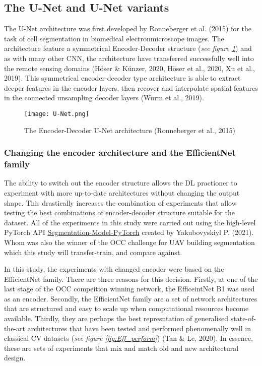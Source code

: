 \documentclass[11pt, a4paper, twoside]{report}
\begin{document}
\subsection{The U-Net and U-Net variants}\label{Unet}

The U-Net architecture was first developed by Ronneberger et al. (2015) for the task of cell segmentation in biomedical electronmicroscope images. The architecture feature a symmetrical Encoder-Decoder structure (\textit{see figure \ref{fig:U-Net}}) and as with many other CNN, the architecture have transferred successfully well into the remote sensing domains (Höser \& Künzer, 2020, Höser et al., 2020, Xu et al., 2019). This symmetrical encoder-decoder type architecture is able to extract deeper features in the encoder layers, then recover and interpolate spatial features in the connected unsampling decoder layers (Wurm et al., 2019).\\\par

\begin{figure}[H]
  \centering
  \texttt{[image: U-Net.png]}
  \caption{The Encoder-Decoder U-Net architecture (Ronneberger et al., 2015)}
  \label{fig:U-Net}
\end{figure}

\subsubsection{Changing the encoder architecture and the EfficientNet family}\label{EffNet}

The ability to switch out the encoder structure allows the DL practioner to experiment with more up-to-date architectures without changing the output shape. This drastically increases the combination of experiments that allow testing the best combinations of encoder-decoder structure suitable for the dataset. All of the experiments in this study were carried out using the high-level PyTorch API \href{https://segmentation-models-pytorch.readthedocs.io/en/latest/quickstart.html}{Segmentation-Model-PyTorch} created by Yakubovyskiyl P. (2021). Whom was also the winner of the OCC challenge for UAV building segmentation which this study will transfer-train, and compare against.\\\par

In this study, the experiments with changed encoder were based on the EfficientNet family. There are three reasons for this decision. Firstly, at one of the last stage of the OCC compeition winning network, the EfficeintNet B1 was used as an encoder. Secondly, the EfficientNet family are a set of network architectures that are structured and easy to scale up when computational resources become available. Thirdly, they are perhaps the best represntation of generalised state-of-the-art architectures that have been tested and performed phenomenally well in classical CV datasets (\textit{see figure \ref{fig:Eff_perform}}) (Tan \& Le, 2020). In essence, these are sets of experiments that mix and match old and new architectural design.\\\par
\end{document}
